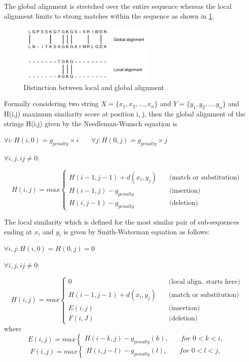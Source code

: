 \documentclass[12pt,twoside]{article}
\begin{document}
The global alignment is stretched over the entire sequence whereas the local alignment limits to strong matches within
the sequence as shown in \cref{fig:localglobal}. 

\begin{figure}%
    \centering
    \includegraphics[width=0.6\textwidth]{fig/localglobal}
    \caption{Distinction between local and global alignment \cite[Figure 3.1]{mount_bioinformatics:_2004}}
    \label{fig:localglobal}
\end{figure}

Formally considering two string $ X = \{x_1, x_2, ..., x_n\} $ and $Y = \{y_1, y_2, .... y_n\}$
and H(i,j) maximum similarity score at position i, j, then the global alignment of the strings H(i,j) given by
the Needleman-Wunsch equation \cite{needleman_general_1970} is 

\( \forall i :  H(i,0) = g_{penalty} \times i \) \,\,\,\,\,\,\, \( \forall j :  H(0,j) = g_{penalty} \times j \)

\( \forall i,j,ij \neq 0: \)

\[ H(i,j) =  max
\begin{cases}	
	H(i - 1, j - 1) + d(x_i, y_j) & \quad \text{(match or substitution)} \\
	H(i - 1, j) - g_{penalty} 	  & \quad \text{(insertion)}\\
	H(i, j - 1) - g_{penalty}     & \quad \text{(deletion)}
\end{cases}
\]

The local similarity which is defined for the most similar pair of sub-sequences ending at $x_i$ and $y_i$ is given by
Smith-Waterman \cite{smith_identification_1981} equation as follows:

\( \forall i,j :  H(i,0) = H(0,j) = 0 \)

\( \forall i,j,ij \neq 0: \)

\[ H(i,j) =  max
\begin{cases}
	0							  & \quad \text{(local align. starts here)} \\
	H(i - 1, j - 1) + d(x_i, y_j) & \quad \text{(match or substitution)} \\
	E(i,j)	  & \quad \text{(insertion)}\\
	F(i,J)    & \quad \text{(deletion)}
\end{cases}
\]
where
\[
E(i,j) = max \begin{cases} H(i - k, j) - g_{penalty}(k), & \quad for \,\, 0 < k < i, \end{cases} 
\]
\[
F(i,j) = max \begin{cases} H(i,j - l) - g_{penalty}(l), & \quad for \,\, 0 < l < j, \end{cases}
\]
\end{document}

